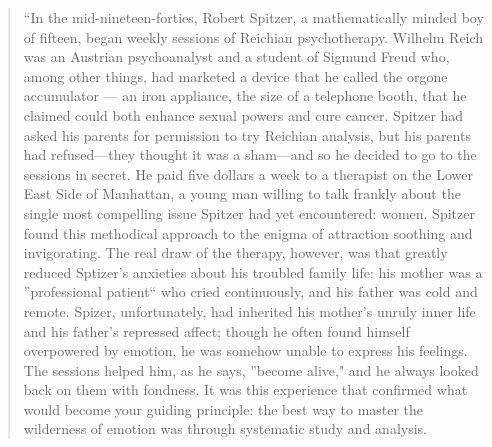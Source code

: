 \begin{quote}

``In the mid-nineteen-forties, Robert Spitzer, a mathematically minded boy of fifteen, began weekly sessions of Reichian psychotherapy. Wilhelm Reich was an Austrian psychoanalyst and a student of Sigmund Freud who, among other things, had marketed a device that he called the orgone accumulator --- an iron appliance, the size of a telephone booth, that he claimed could both enhance sexual powers and cure cancer. Spitzer had asked his parents for permission to try Reichian analysis, but his parents had refused---they thought it was a sham---and so he decided to go to the sessions in secret. He paid five dollars a week to a therapist on the Lower East Side of Manhattan, a young man willing to talk frankly about the single most compelling issue Spitzer had yet encountered: women. Spitzer found this methodical approach to the enigma of attraction soothing and invigorating. The real draw of the therapy, however, was that greatly reduced Sptizer's anxieties about his troubled family life: his mother was a ''professional patient`` who cried continuously, and his father was cold and remote. Spizer, unfortunately, had inherited his mother's unruly inner life and his father's repressed affect; though he often found himself overpowered by emotion, he was somehow unable to express his feelings. The sessions helped him, as he says, ''become alive," and he always looked back on them with fondness. It was this experience that confirmed what would become your guiding principle: the best way to master the wilderness of emotion was through systematic study and analysis.


\end{quote}
